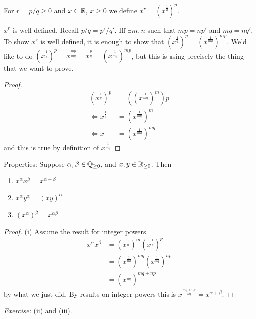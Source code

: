 \documentclass[10pt]{scrartcl}
\begin{document}
\begin{definition}
For $r = p/q \geq 0$ and $x \in\mathbb{R}$, $x \geq 0$ we define $x^r = \left(x^{\frac{1}{q}}\right)^p$.	
\end{definition}

\begin{remark} $x^r$ is well-defined. Recall $p/q = p'/q'$. Iff $\exists m,n$ such that $mp = np'$ and $mq = nq'$. To show $x^r$ is well defined, it is enough to show that $(x^{\frac{1}{q}})^p = ( x^{\frac{1}{mq}})^{mp}$. We'd like to do $(x^{\frac{1}{q}})^p = x^{\frac{mp}{mq}} = x^{\frac{p}{q}} =( x^{\frac{1}{mq}})^{mp}$, 
but this is using precisely the thing that we want to prove.

\begin{proof}
\[
\begin{aligned}
    \left(x^{\frac{1}{q}}\right)^p &= \left(\left(x^{\frac{1}{mq}}\right)^m\right)p \\
    \iff x^{\frac{1}{q}} &= \left(x^{\frac{1}{mq}}\right)^m\\
    \iff x &= \left( x^{\frac{1}{mq}}\right)^{mq} 
\end{aligned}
\]
and this is true by definition of $x^{\frac{1}{mq}}$
\end{proof}
\end{remark}


Properties: Suppose $\alpha, \beta \in \mathbb{Q}_{\geq 0}$, and $x,y \in \mathbb{R}_{\geq 0}$. Then 
\begin{enumerate}
\item $x^\alpha x^\beta = x^{\alpha + \beta}$
\item $x^{\alpha} y^{\alpha} = (xy)^{\alpha}$
\item $(x^\alpha)^\beta = x^{\alpha \beta}$
\end{enumerate}

\begin{proof} (i) Assume the result for integer powers. 
\[
\begin{aligned}
  x^\alpha x^\beta &= \left(x^{\frac{1}{n}}\right)^m \left(x^{\frac{1}{q}}\right)^p\\
  &= \left(x^{\frac{1}{nq}}\right)^{mq} \left(x^{\frac{1}{nq}}\right)^{np}\\
  &= \left(x^{\frac{1}{nq}}\right)^{mq + np}
\end{aligned}
\]
by what we just did. By results on integer powers this is $x^{\frac{mq + np}{nq}} = x^{\alpha + \beta}$. 
\end{proof}
\emph{Exercise:} (ii) and (iii).
\end{document}
